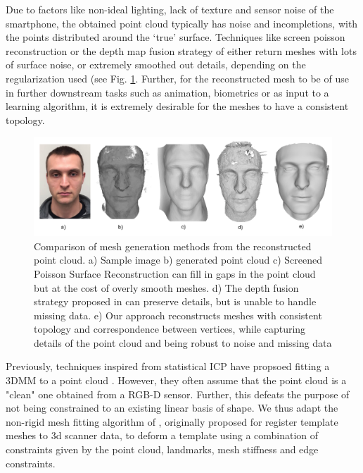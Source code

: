 \documentclass[10pt,twocolumn,letterpaper]{article}
\begin{document}
Due to factors like non-ideal lighting, lack of texture and sensor noise of the smartphone, the obtained point cloud typically has noise and incompletions, with the points distributed around the `true' surface.
 Techniques like screen poisson reconstruction or the depth map fusion strategy of \cite{hernandez2015near} either return meshes with lots of surface noise, or extremely smoothed out details, depending on the regularization used (see Fig. \ref{fig:mesh_comp}. Further, for the reconstructed mesh to be of use in further downstream tasks such as animation, biometrics or as input to a learning algorithm, it is extremely desirable for the meshes to have a consistent topology. \\
 \begin{figure}[t]
\begin{center}
   \includegraphics[width=0.95\linewidth]{images/meshing_compare.png}
\end{center}
   \caption{Comparison of mesh generation methods from the reconstructed point cloud. a) Sample image b) generated point cloud c) Screened Poisson Surface Reconstruction\cite{kazhdan2013screened} can fill in gaps in the point cloud but at the cost of overly smooth meshes. d) The depth fusion strategy proposed in \cite{hernandez2015near} can preserve details, but is unable to handle missing data. e) Our approach reconstructs meshes with consistent topology and correspondence between vertices, while capturing details of the point cloud and being robust to noise and missing data }
\label{fig:mesh_comp}
\end{figure}

 Previously, techniques inspired from statistical ICP have propsoed fitting a 3DMM to a point cloud \cite{schneider2009fitting,bazik2017robust}. However, they often assume that the point cloud is a "clean" one obtained from a RGB-D sensor. Further, this defeats the purpose of not being constrained to an existing linear basis of shape.
 We thus adapt the non-rigid mesh fitting algorithm of \cite{amberg2007optimal}, originally proposed for register template meshes to 3d scanner data, to deform a template using a combination of constraints given by the point cloud, landmarks, mesh stiffness and edge constraints. 
 
\end{document}
